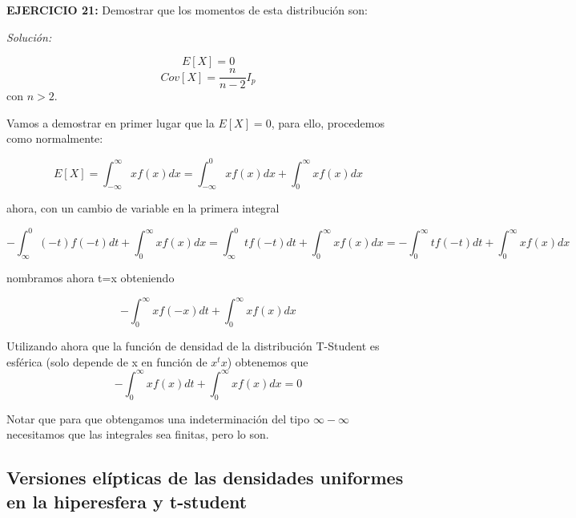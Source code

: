 \documentclass{article}
\theoremstyle{theorem-style}  %
\theoremstyle{definition}
\theoremstyle{example-style}
\begin{document}
	\textbf{EJERCICIO 21:} Demostrar que los momentos de esta distribución son:
	
	\textit{Solución: }
	
	$$ E[X]=0$$ $$ Cov[X]= \frac{n}{n-2}I_{p}$$ con $n>2$. 
	
	Vamos a demostrar en primer lugar que la $E[X] = 0$, para ello, procedemos como normalmente:
	
	\[
		E[X] = \int_{-\infty}^{\infty} x f(x) dx = \int_{-\infty}^{0} x f(x) dx + \int_{0}^{\infty} x f(x) dx 
	\]
	
	ahora, con un cambio de variable en la primera integral
	
	\[
		- \int_{\infty}^{0} (-t) f(-t) dt + \int_{0}^{\infty} x f(x) dx  = \int_{\infty}^{0} t f(-t) dt + \int_{0}^{\infty} x f(x) dx = 
		- \int_{0}^{\infty} t f(-t) dt + \int_{0}^{\infty} x f(x) dx 
	\]
	
	nombramos ahora t=x obteniendo
	
	\[
	- \int_{0}^{\infty} x f(-x) dt + \int_{0}^{\infty} x f(x) dx 
	\]
	
	Utilizando ahora que la función de densidad de la distribución T-Student es esférica (solo depende de x en función de $x^t x$) obtenemos que 
	\[
		- \int_{0}^{\infty} x f(x) dt + \int_{0}^{\infty} x f(x) dx = 0
	\]
	
	Notar que para que obtengamos una indeterminación del tipo $\infty - \infty$ necesitamos que las integrales sea finitas, pero lo son.
	
		
	
	\subsection{Versiones elípticas de las densidades uniformes en la hiperesfera y t-student}
	
\end{document}
